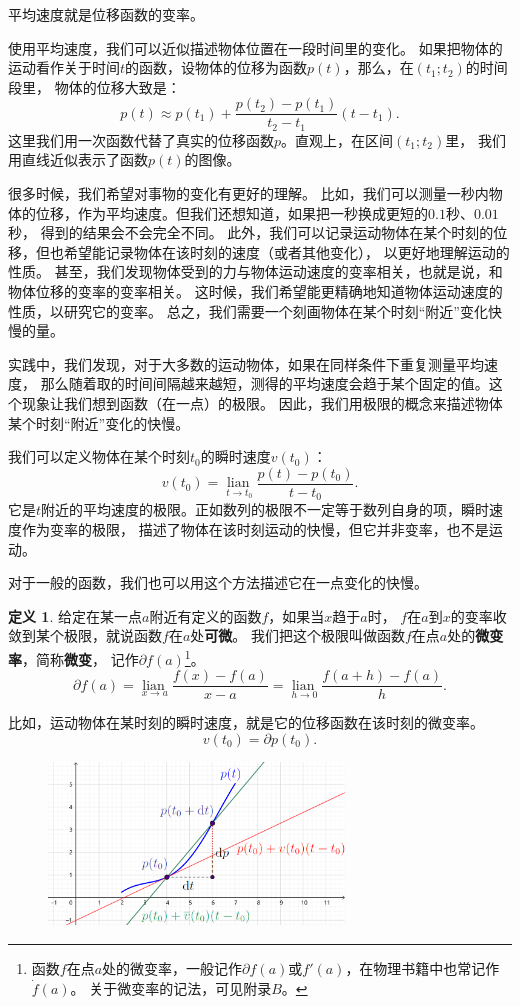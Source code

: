 \documentclass[12pt,UTF8]{ctexbook}
\newcommand{\lian}[1]{
    \underset{#1}{\operatorname{lian}\,}
}
\theoremstyle{definition}
\newtheorem{df}{定义}[section]
\theoremstyle{plain}
\begin{document}
平均速度就是位移函数的变率。

使用平均速度，我们可以近似描述物体位置在一段时间里的变化。
如果把物体的运动看作关于时间$t$的函数，设物体的位移为函数$p(t)$，那么，在$(t_1; t_2)$的时间段里，
物体的位移大致是：
$$ p(t) \approx p(t_1) + \frac{p(t_2) - p(t_1)}{t_2 - t_1}(t - t_1).$$
这里我们用一次函数代替了真实的位移函数$p$。直观上，在区间$(t_1; t_2)$里，
我们用直线近似表示了函数$p(t)$的图像。

很多时候，我们希望对事物的变化有更好的理解。
比如，我们可以测量一秒内物体的位移，作为平均速度。但我们还想知道，如果把一秒换成更短的$0.1$秒、$0.01$秒，
得到的结果会不会完全不同。
此外，我们可以记录运动物体在某个时刻的位移，但也希望能记录物体在该时刻的速度（或者其他变化），
以更好地理解运动的性质。
甚至，我们发现物体受到的力与物体运动速度的变率相关，也就是说，和物体位移的变率的变率相关。
这时候，我们希望能更精确地知道物体运动速度的性质，以研究它的变率。
总之，我们需要一个刻画物体在某个时刻“附近”变化快慢的量。

实践中，我们发现，对于大多数的运动物体，如果在同样条件下重复测量平均速度，
那么随着取的时间间隔越来越短，测得的平均速度会趋于某个固定的值。这个现象让我们想到函数（在一点）的极限。
因此，我们用极限的概念来描述物体某个时刻“附近”变化的快慢。

我们可以定义物体在某个时刻$t_0$的瞬时速度$v(t_0)$：
$$ v(t_0) = \lian{t\to t_0} \frac{p(t) - p(t_0)}{t - t_0}.$$
它是$t$附近的平均速度的极限。正如数列的极限不一定等于数列自身的项，瞬时速度作为变率的极限，
描述了物体在该时刻运动的快慢，但它并非变率，也不是运动。

对于一般的函数，我们也可以用这个方法描述它在一点变化的快慢。

\begin{df}\label{df:2-1-0}
给定在某一点$a$附近有定义的函数$f$，如果当$x$趋于$a$时，
$f$在$a$到$x$的变率收敛到某个极限，就说函数$f$在$a$处\textbf{可微}。
我们把这个极限叫做函数$f$在点$a$处的\textbf{微变率}，简称\textbf{微变}，
记作$\partial f(a)$\footnote{函数$f$在点$a$处的微变率，一般记作$\partial f(a)$或$f'(a)$，在物理书籍中也常记作$\dot{f}(a)$。
关于微变率的记法，可见附录$B$。}。
$$ \partial f(a) = \lian{x\to a} \frac{f(x) - f(a)}{x - a} = \lian{h\to 0} \frac{f(a + h) - f(a)}{h}.$$
\end{df}

比如，运动物体在某时刻的瞬时速度，就是它的位移函数在该时刻的微变率。
$$ v(t_0) = \partial p(t_0).$$

\begin{figure}[h]
    \vspace{4pt}
    \centering
    \includegraphics[width=0.7\textwidth]{tu/导数1.png}
\end{figure}
\end{document}
